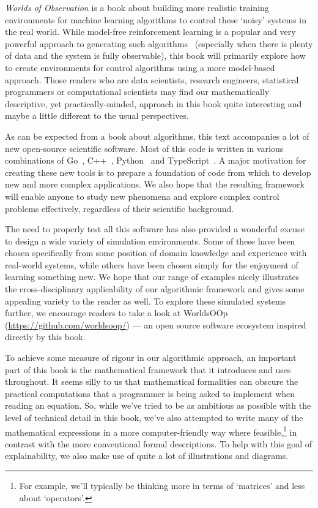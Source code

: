 \documentclass{book}
\begin{document}
\emph{Worlds of Observation} is a book about building more realistic training environments for machine learning algorithms to control these `noisy' systems in the real world. While model-free reinforcement learning is a popular and very powerful approach to generating such algorithms~\cite{sutton2018reinforcement} (especially when there is plenty of data and the system is fully observable), this book will primarily explore how to create environments for control algorithms using a more model-based approach. Those readers who are data scientists, research engineers, statistical programmers or computational scientists may find our mathematically descriptive, yet practically-minded, approach in this book quite interesting and maybe a little different to the usual perspectives.

As can be expected from a book about algorithms, this text accompanies a lot of new open-source scientific software. Most of this code is written in various combinations of Go~\cite{golang}, C++~\cite{c++lang}, Python~\cite{pythonlang} and TypeScript~\cite{typescriptlang}. A major motivation for creating these new tools is to prepare a foundation of code from which to develop new and more complex applications. We also hope that the resulting framework will enable anyone to study new phenomena and explore complex control problems effectively, regardless of their scientific background.

The need to properly test all this software has also provided a wonderful excuse to design a wide variety of simulation environments. Some of these have been chosen specifically from some position of domain knowledge and experience with real-world systems, while others have been chosen simply for the enjoyment of learning something new. We hope that our range of examples nicely illustrates the cross-disciplinary applicability of our algorithmic framework and gives some appealing variety to the reader as well. To explore these simulated systems further, we encourage readers to take a look at WorldsOOp (\href{https://github.com/worldsoop/}{https://github.com/worldsoop/}) --- an open source software ecosystem inspired directly by this book.

To achieve some measure of rigour in our algorithmic approach, an important part of this book is the mathematical framework that it introduces and uses throughout. It seems silly to us that mathematical formalities can obscure the practical computations that a programmer is being asked to implement when reading an equation. So, while we've tried to be as ambitious as possible with the level of technical detail in this book, we've also attempted to write many of the mathematical expressions in a more computer-friendly way where feasible,\footnote{For example, we'll typically be thinking more in terms of `matrices' and less about `operators'.} in contrast with the more conventional formal descriptions. To help with this goal of explainability, we also make use of quite a lot of illustrations and diagrams.
\end{document}
